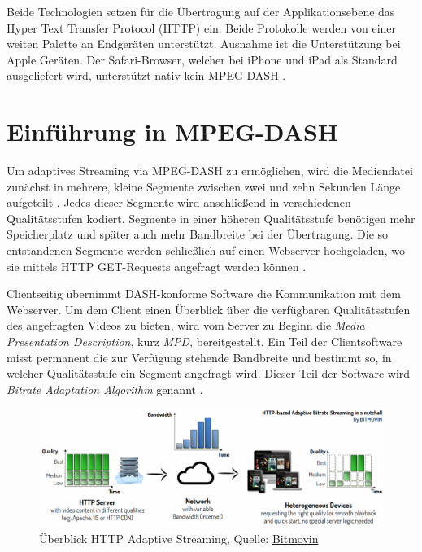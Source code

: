 \documentclass[paper = a4, fontsize = 12pt, parskip = half]{scrartcl} %
\begin{document}
Beide Technologien setzen für die Übertragung auf der Applikationsebene das Hyper Text Transfer Protocol (HTTP) ein. Beide Protokolle werden von einer weiten Palette an Endgeräten unterstützt. Ausnahme ist die Unterstützung bei Apple Geräten. Der Safari-Browser, welcher bei iPhone und iPad als Standard ausgeliefert wird, unterstützt nativ kein MPEG-DASH \cite{timmerer_live_2015} .

\section{Einführung in MPEG-DASH}
Um adaptives Streaming via MPEG-DASH zu ermöglichen, wird die Mediendatei zunächst in mehrere, kleine Segmente zwischen zwei und zehn Sekunden Länge aufgeteilt \cite{international_organization_for_standardization_isoiec_nodate}. Jedes dieser Segmente wird anschließend in verschiedenen Qualitätsstufen kodiert. Segmente in einer höheren Qualitätsstufe benötigen mehr Speicherplatz und später auch mehr Bandbreite bei der Übertragung. Die so entstandenen Segmente werden schließlich auf einen Webserver hochgeladen, wo sie mittels HTTP GET-Requests angefragt werden können \cite{sodagar_mpeg-dash_2011}. 

Clientseitig übernimmt DASH-konforme Software die Kommunikation mit dem Webserver. Um dem Client einen Überblick über die verfügbaren Qualitätsstufen des angefragten Videos zu bieten, wird vom Server zu Beginn die \textit{Media Presentation Description}, kurz \textit{MPD}, bereitgestellt. Ein Teil der Clientsoftware misst permanent die zur Verfügung stehende Bandbreite und bestimmt so, in welcher Qualitätsstufe ein Segment angefragt wird. Dieser Teil der Software wird \textit{Bitrate Adaptation Algorithm} genannt \cite{bentaleb_survey_2019}. 

	\begin{figure}
		\centering
		\includegraphics[width=14cm]{images/adaptive-streaming-basic.png}
		\caption{Überblick HTTP Adaptive Streaming, Quelle: \hyperref{https://bitmovin.com/dynamic-adaptive-streaming-http-mpeg-dash/}{}{}{Bitmovin}}
	\end{figure}
\end{document}
